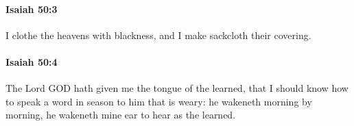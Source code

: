 		\paragraph{Isaiah 50:3} %
			\label{ISAIAH-50-3}

			I clothe the heavens with blackness, and I make sackcloth their covering.


		\paragraph{Isaiah 50:4} %
			\label{ISAIAH-50-4}

			The Lord GOD hath given me the tongue of the learned, that I should know how to speak a word in season to him that is weary: he wakeneth morning by morning, he wakeneth mine ear to hear as the learned.


